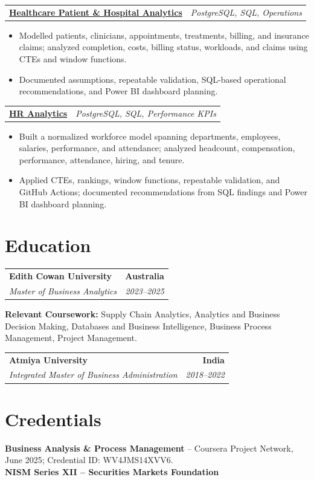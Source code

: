 \documentclass[letterpaper,10pt]{article}
\makeatletter
\newcommand{\role}[4]{%
  \begin{tabularx}{\textwidth}{@{}Xr@{}}
    \textbf{#1} & \textbf{#2} \\
    \textit{#3} & \textit{#4}
  \end{tabularx}\vspace{-1pt}
}
\newcommand{\project}[2]{%
  \begin{tabularx}{\textwidth}{@{}Xr@{}}
    \textbf{#1} & \textit{#2}
  \end{tabularx}\vspace{-1pt}
}
\makeatother
\begin{document}
\project{\href{https://github.com/jainalimehta/Healthcare-Analytics}{Healthcare Patient \& Hospital Analytics}}{PostgreSQL, SQL, Operations}
\begin{itemize}
  \item Modelled patients, clinicians, appointments, treatments, billing, and insurance claims; analyzed completion, costs, billing status, workloads, and claims using CTEs and window functions.
  \item Documented assumptions, repeatable validation, SQL-based operational recommendations, and Power BI dashboard planning.
\end{itemize}
\vspace{1pt}

\project{\href{https://github.com/jainalimehta/HR-Analytics}{HR Analytics}}{PostgreSQL, SQL, Performance KPIs}
\begin{itemize}
  \item Built a normalized workforce model spanning departments, employees, salaries, performance, and attendance; analyzed headcount, compensation, performance, attendance, hiring, and tenure.
  \item Applied CTEs, rankings, window functions, repeatable validation, and GitHub Actions; documented recommendations from SQL findings and Power BI dashboard planning.
\end{itemize}

\section{Education}
\role{Edith Cowan University}{Australia}{Master of Business Analytics}{2023--2025}
\small\textbf{Relevant Coursework:} Supply Chain Analytics, Analytics and Business Decision Making, Databases and Business Intelligence, Business Process Management, Project Management.\\[2pt]
\role{Atmiya University}{India}{Integrated Master of Business Administration}{2018--2022}

\section{Credentials}
\small\textbf{Business Analysis \& Process Management} -- Coursera Project Network, June 2025; Credential ID: WV4JMS14XVV6.\\[-0.2pt]
\small\textbf{NISM Series XII -- Securities Markets Foundation}
\end{document}

